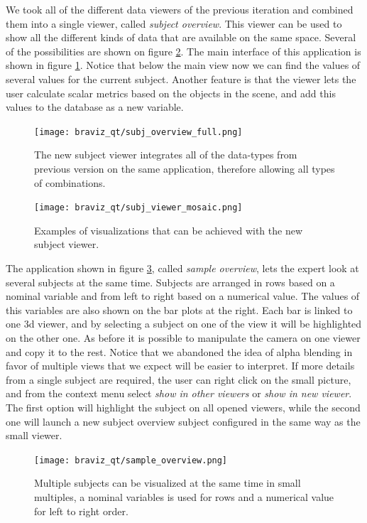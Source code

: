 We took all of the different data viewers of the previous iteration and combined them into a single viewer, called \emph{subject overview}. This viewer can be used to show all the different kinds of data that are available on the same space. Several of the possibilities are shown on figure \ref{fig_subj_viewer_mosaic}. The main interface of this application is shown in figure \ref{fig_subj_overview_2}. Notice that below the main view now we can find the values of several values for the current subject. Another feature is that the viewer lets the user calculate scalar metrics based on the objects in the scene, and add this values to the database as a new variable.

\begin{figure}
\centering
\texttt{[image: braviz\_qt/subj\_overview\_full.png]} 
\caption{\label{fig_subj_overview_2}The new subject viewer integrates all of the data-types from previous version on the same application, therefore allowing all types of combinations.}
\end{figure}

\begin{figure}
\centering
\texttt{[image: braviz\_qt/subj\_viewer\_mosaic.png]} 
\caption{\label{fig_subj_viewer_mosaic}Examples of visualizations that can be achieved with the new subject viewer.}
\end{figure}

The application shown in figure \ref{fig_sample_overview_2}, called \emph{sample overview}, lets the expert look at several subjects at the same time. Subjects are arranged in rows based on a nominal variable and from left to right based on a numerical value. The values of this variables are also shown on the bar plots at the right. Each bar is linked to one 3d viewer, and by selecting a subject on one of the view it will be highlighted on the other one. As before it is possible to manipulate the camera on one viewer and copy it to the rest. Notice that we abandoned the idea of alpha blending in favor of multiple views that we expect will be easier to interpret. If more details from a single subject are required, the user can right click on the small picture, and from the context menu select \emph{show in other viewers} or \emph{show in new viewer}. The first option will highlight the subject on all opened viewers, while the second one will launch a new subject overview subject configured in the same way as the small viewer.

\begin{figure}
\centering
\texttt{[image: braviz\_qt/sample\_overview.png]} 
\caption{\label{fig_sample_overview_2}Multiple subjects can be visualized at the same time in small multiples, a nominal variables is used for rows and a numerical value for left to right order.}
\end{figure}

